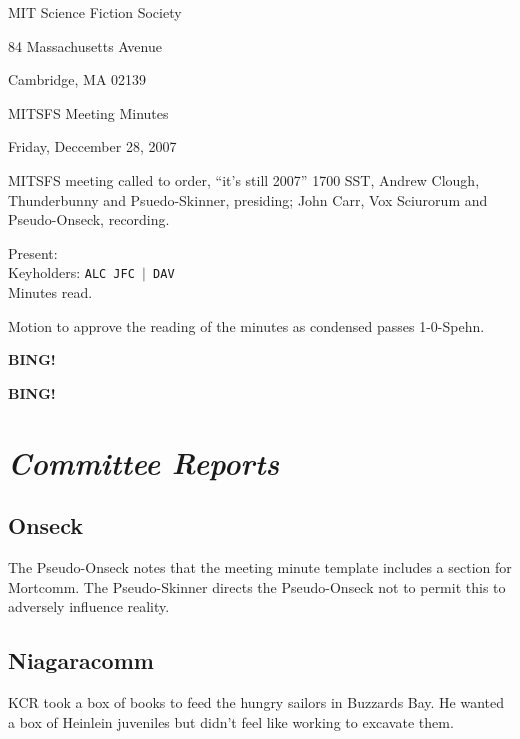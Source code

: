 \documentclass[10pt]{article}
\newcommand{\bing}{{\bf BING!} }
\newcommand{\goto}[1]{\bing \vskip 12pt \section*{{\em{#1}}}}
\begin{document}
\begin{center}

MIT Science Fiction Society

84 Massachusetts Avenue

Cambridge, MA 02139

\vspace{12pt}

MITSFS Meeting Minutes

Friday, Deccember 28, 2007

\end{center}

\vspace{18pt}

\setlength{\parskip}{6pt}

\noindent
MITSFS meeting called to order, ``it's still 2007'' 1700 SST,
Andrew Clough, Thunderbunny and Psuedo-Skinner, presiding;
John Carr, Vox Sciurorum and Pseudo-Onseck, recording.

Present:\\
Keyholders: \texttt{ALC JFC $|$ DAV}\\


Minutes read.

Motion to approve the reading of the minutes as condensed passes \hbox{1-0-Spehn}.

\bing

\goto{Committee Reports}

\subsection*{Onseck}
The Pseudo-Onseck notes that the meeting minute template includes a
section for Mortcomm.  The Pseudo-Skinner directs the Pseudo-Onseck
not to permit this to adversely influence reality.

\subsection*{Niagaracomm}

KCR took a box of books to feed the hungry sailors in Buzzards Bay.
He wanted a box of Heinlein juveniles but didn't feel like working
to excavate them.


\end{document}
